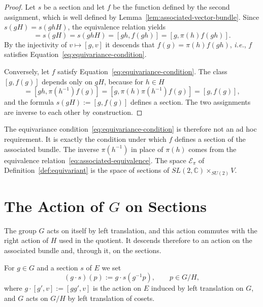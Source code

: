 	\begin{proof}
		Let $s$ be a section and let $f$ be the function defined by the second assignment, which is well defined by Lemma~\ref{lem:associated-vector-bundle}. Since $s(gH)=s(ghH)$, the equivalence relation yields
		\begin{equation*}
			[g,f(g)]=s(gH)=s(ghH)=[gh,f(gh)]=[g,\pi(h)f(gh)].
		\end{equation*}
		By the injectivity of $v\mapsto[g,v]$ it descends that $f(g)=\pi(h)f(gh)$, \textit{i.e.}, $f$ satisfies Equation~\eqref{eq:equivariance-condition}.
		
		Conversely, let $f$ satisfy Equation~\eqref{eq:equivariance-condition}. The class $[g,f(g)]$ depends only on $gH$, because for $h\in H$
		\begin{equation*}
			[gh,f(gh)]=[gh,\pi(h^{-1})f(g)]=[g,\pi(h)\pi(h^{-1})f(g)]=[g,f(g)],
		\end{equation*}
		and the formula $s(gH):=[g,f(g)]$ defines a section. The two assignments are inverse to each other by construction.
	\end{proof}
	
	\begin{remark}\label{rem:equivariance-not-artificial}
		The equivariance condition~\eqref{eq:equivariance-condition} is therefore not an ad hoc requirement. It is exactly the condition under which $f$ defines a section of the associated bundle. The inverse $\pi(h^{-1})$ in place of $\pi(h)$ comes from the equivalence relation~\eqref{eq:associated-equivalence}. The space $\mathcal{E}_\pi$ of Definition~\ref{def:equivariant} is the space of sections of $SL(2,\mathbb{C})\times_{SU(2)}V$.
	\end{remark}
	
	\section{The Action of $G$ on Sections}
	\label{sec:action-sections}
	
	The group $G$ acts on itself by left translation, and this action commutes with the right action of $H$ used in the quotient. It descends therefore to an action on the associated bundle and, through it, on the sections.
	
	\begin{definition}\label{def:left-translation-sections}
		For $g\in G$ and a section $s$ of $E$ we set
		\begin{equation*}
			(g\cdot s)(p):=g\cdot s(g^{-1}p),\qquad p\in G/H,
		\end{equation*}
		where $g\cdot[g',v]:=[gg',v]$ is the action on $E$ induced by left translation on $G$, and $G$ acts on $G/H$ by left translation of cosets.
	\end{definition}
	
